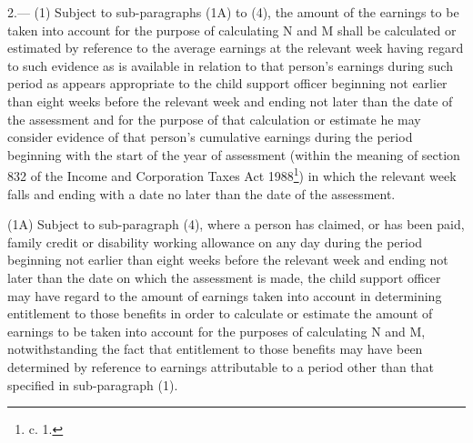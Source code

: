 \documentclass[12pt,a4paper]{article}
\begin{document}
2.—%
%
%
%
(1) Subject to sub-paragraphs 
(1A)  %
to (4), the amount of the earnings to be taken into account for the purpose of calculating N and M shall be calculated or estimated by reference to the average earnings at the relevant week having regard to such evidence as is available in relation to that person’s earnings during such period as appears appropriate to the child support officer beginning not earlier than eight weeks before the relevant week and ending not later than the date of the assessment and for the purpose of that calculation or estimate he may consider evidence of that person’s cumulative earnings during the period beginning with the start of the year of assessment (within the meaning of section 832 of the Income and Corporation Taxes Act 1988\footnote{ c. 1.}) in which the relevant week falls and ending with a date no later than the date of the assessment.

(1A) Subject to sub-paragraph (4), where a person has claimed, or has been paid, family credit or disability working allowance on any day during the period beginning not earlier than eight weeks before the relevant week and ending not later than the date on which the assessment is made, the child support officer may have regard to the amount of earnings taken into account in determining entitlement to those benefits in order to calculate or estimate the amount of earnings to be taken into account for the purposes of calculating N and M, notwithstanding the fact that entitlement to those benefits may have been determined by reference to earnings attributable to a period other than that specified in sub-paragraph (1).
\end{document}
